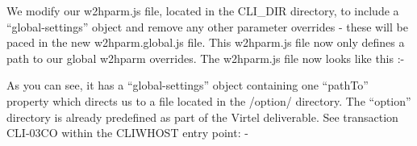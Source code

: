 \documentclass[letterpaper,10pt,english]{sphinxmanual}
\begin{document}
\begin{sphinxVerbatim}[commandchars=\\\{\}]
      
   
       
       
       
\end{sphinxVerbatim}

We modify our w2hparm.js file, located in the CLI\_DIR directory, to include a “global-settings” object and remove any other parameter overrides - these will be paced in the new w2hparm.global.js file. This w2hparm.js file now only defines a path to our global w2hparm overrides. The w2hparm.js file now looks like this :-

\begin{sphinxVerbatim}[commandchars=\\\{\}]
   
   
\end{sphinxVerbatim}

As you can see, it has a “global-settings” object containing one “pathTo” property which directs us to a file located in the /option/ directory. The “option” directory is already predefined as part of the Virtel deliverable. See transaction CLI-03CO within the CLIWHOST entry point: -
\end{document}
